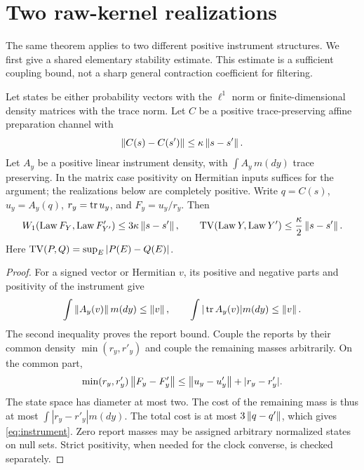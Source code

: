 \section{Two raw-kernel realizations}\label{sec:kernels}
The same theorem applies to two different positive instrument structures. We first give a shared elementary stability estimate. This estimate is a sufficient coupling bound, not a sharp general contraction coefficient for filtering.

\begin{lemma}\label{lem:instrument}
Let states be either probability vectors with the $\ell^1$ norm or finite-dimensional density matrices with the trace norm. Let $C$ be a positive trace-preserving affine preparation channel with
\[
 \left\lVert C(s)-C(s')\right\rVert\le\kappa\left\lVert s-s'\right\rVert.
\]
Let $A_y$ be a positive linear instrument density, with $\int A_y\,m(dy)$ trace preserving. In the matrix case positivity on Hermitian inputs suffices for the argument; the realizations below are completely positive. Write $q=C(s)$, $u_y=A_y(q)$, $r_y=\operatorname{tr} u_y$, and $F_y=u_y/r_y$. Then
\begin{equation}\label{eq:instrument}
 W_1(\operatorname{Law} F_Y,\operatorname{Law} F'_{Y'})\le3\kappa\left\lVert s-s'\right\rVert,\qquad
 \operatorname{TV}(\operatorname{Law} Y,\operatorname{Law} Y')\le\frac{\kappa}{2}\left\lVert s-s'\right\rVert.
\end{equation}
Here $\operatorname{TV}(P,Q)=\sup_E|P(E)-Q(E)|$.
\end{lemma}
\begin{proof}
For a signed vector or Hermitian $v$, its positive and negative parts and positivity of the instrument give
\[
 \int\left\lVert A_y(v)\right\rVert m(dy)\le\left\lVert v\right\rVert,\qquad
 \int|\operatorname{tr} A_y(v)|m(dy)\le\left\lVert v\right\rVert.
\]
The second inequality proves the report bound. Couple the reports by their common density $\min(r_y,r'_y)$ and couple the remaining masses arbitrarily. On the common part,
\[
 \min(r_y,r'_y)\left\lVert F_y-F'_y\right\rVert
 \le\left\lVert u_y-u'_y\right\rVert+|r_y-r'_y|.
\]
The state space has diameter at most two. The cost of the remaining mass is thus at most $\int|r_y-r'_y|m(dy)$. The total cost is at most $3\left\lVert q-q'\right\rVert$, which gives \eqref{eq:instrument}. Zero report masses may be assigned arbitrary normalized states on null sets. Strict positivity, when needed for the clock converse, is checked separately.
\end{proof}

